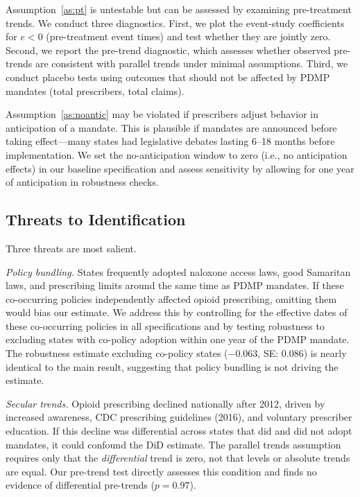 \documentclass[12pt]{article}
\begin{document}
Assumption~\ref{as:pt} is untestable but can be assessed by examining pre-treatment trends. We conduct three diagnostics. First, we plot the event-study coefficients for $e < 0$ (pre-treatment event times) and test whether they are jointly zero. Second, we report the \citet{roth2023pretest} pre-trend diagnostic, which assesses whether observed pre-trends are consistent with parallel trends under minimal assumptions. Third, we conduct placebo tests using outcomes that should not be affected by PDMP mandates (total prescribers, total claims).

Assumption~\ref{as:noantic} may be violated if prescribers adjust behavior in anticipation of a mandate. This is plausible if mandates are announced before taking effect---many states had legislative debates lasting 6--18 months before implementation. We set the no-anticipation window to zero (i.e., no anticipation effects) in our baseline specification and assess sensitivity by allowing for one year of anticipation in robustness checks.

\subsection{Threats to Identification}\label{sec:empirical_threats}

Three threats are most salient.

\textit{Policy bundling.} States frequently adopted naloxone access laws, good Samaritan laws, and prescribing limits around the same time as PDMP mandates. If these co-occurring policies independently affected opioid prescribing, omitting them would bias our estimate. We address this by controlling for the effective dates of these co-occurring policies in all specifications and by testing robustness to excluding states with co-policy adoption within one year of the PDMP mandate. The robustness estimate excluding co-policy states ($-0.063$, SE: 0.086) is nearly identical to the main result, suggesting that policy bundling is not driving the estimate.

\textit{Secular trends.} Opioid prescribing declined nationally after 2012, driven by increased awareness, CDC prescribing guidelines (2016), and voluntary prescriber education. If this decline was differential across states that did and did not adopt mandates, it could confound the DiD estimate. The parallel trends assumption requires only that the \textit{differential} trend is zero, not that levels or absolute trends are equal. Our pre-trend test directly assesses this condition and finds no evidence of differential pre-trends ($p = 0.97$).
\end{document}
